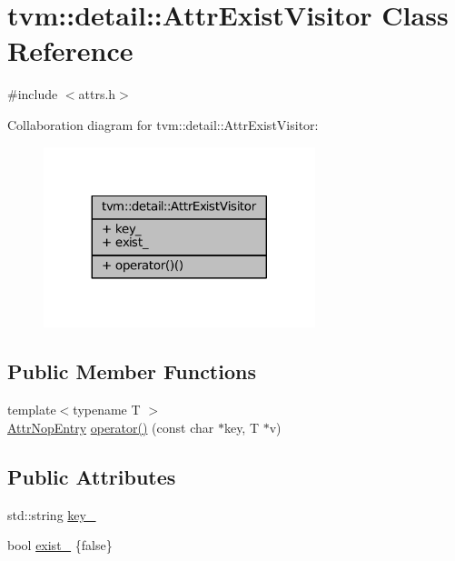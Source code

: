 \hypertarget{classtvm_1_1detail_1_1AttrExistVisitor}{}\section{tvm\+:\+:detail\+:\+:Attr\+Exist\+Visitor Class Reference}
\label{classtvm_1_1detail_1_1AttrExistVisitor}


{\ttfamily \#include $<$attrs.\+h$>$}



Collaboration diagram for tvm\+:\+:detail\+:\+:Attr\+Exist\+Visitor\+:
\nopagebreak
\begin{figure}[H]
\begin{center}
\leavevmode
\includegraphics[width=224pt]{classtvm_1_1detail_1_1AttrExistVisitor__coll__graph}
\end{center}
\end{figure}
\subsection*{Public Member Functions}
\begin{DoxyCompactItemize}
\item 
{\footnotesize template$<$typename T $>$ }\\\hyperlink{structtvm_1_1detail_1_1AttrNopEntry}{Attr\+Nop\+Entry} \hyperlink{classtvm_1_1detail_1_1AttrExistVisitor_a345bb38b31b732a830eb9df3e16f6895}{operator()} (const char $\ast$key, T $\ast$v)
\end{DoxyCompactItemize}
\subsection*{Public Attributes}
\begin{DoxyCompactItemize}
\item 
std\+::string \hyperlink{classtvm_1_1detail_1_1AttrExistVisitor_a42cfd0949c298dea06fb2c4fb39e188d}{key\+\_\+}
\item 
bool \hyperlink{classtvm_1_1detail_1_1AttrExistVisitor_ac6ae7aa3d30f25a953810bcc0d0a938f}{exist\+\_\+} \{false\}
\end{DoxyCompactItemize}


